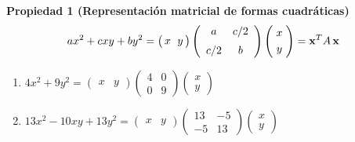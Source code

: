 {\nologo
\begin{frame}%

\begin{prop}{\textbf{Propiedad 1 (Representación matricial de formas cuadráticas)}}
	\[
	ax^2 + cxy + by^2 =
	\left(
	\begin{array}{@{\hspace{0.3\tabcolsep}}c@{\hspace{\tabcolsep}}c@{\hspace{0.3\tabcolsep}}}
	x & y  
	\end{array}
	\right)
	\left(
	\begin{array}{cc}
	a & c/2   \\[2mm]
	c/2 & b
	\end{array}
	\right)
	\left(
	\begin{array}{@{\hspace{0.5\tabcolsep}}c@{\hspace{0.5\tabcolsep}}}
	x   \\[1mm]
	y
	\end{array}
	\right)
	=
	\mathbf{x}^T A\, \mathbf{x}
	\]
\end{prop}

\vspace{2mm}
\begin{enumerate}
	\item[\labelname{6}] $4x^2 +9y^2 = \left(\begin{array}{cc} x &y \end{array}\right) \left(\begin{array}{cc}4&0\\[1mm]0&9\end{array}\right) \left(\begin{array}{c}x\\[1mm] y\end{array}\right)$%
			
	\vspace{3mm}
	\item[\labelname{7}] $13x^2 -10xy+13y^2 = \left(\begin{array}{cc} x &y \end{array}\right) \left(\begin{array}{rr}13&-5\\[1mm]-5&13\end{array}\right) \left(\begin{array}{c}x\\[1mm] y\end{array}\right)$%
\end{enumerate}


\end{frame}}
